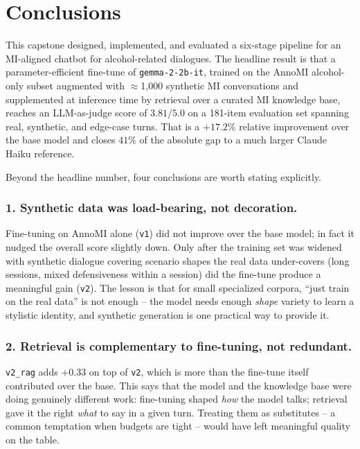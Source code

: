 \section{Conclusions}
\label{sec:conclusions}

This capstone designed, implemented, and evaluated a six-stage pipeline for an
MI-aligned chatbot for alcohol-related dialogues. The headline result is that
a parameter-efficient fine-tune of \texttt{gemma-2-2b-it}, trained on the
AnnoMI alcohol-only subset augmented with $\approx$1{,}000 synthetic MI
conversations and supplemented at inference time by retrieval over a curated
MI knowledge base, reaches an LLM-as-judge score of $3.81/5.0$ on a
181-item evaluation set spanning real, synthetic, and edge-case turns. That
is a $+17.2\%$ relative improvement over the base model and closes $41\%$
of the absolute gap to a much larger Claude Haiku reference.

Beyond the headline number, four conclusions are worth stating explicitly.

\subsubsection*{1. Synthetic data was load-bearing, not decoration.}
Fine-tuning on AnnoMI alone (\texttt{v1}) did not improve over the base model;
in fact it nudged the overall score slightly down. Only after the training set
was widened with synthetic dialogue covering scenario shapes the real data
under-covers (long sessions, mixed defensiveness within a session) did the
fine-tune produce a meaningful gain (\texttt{v2}). The lesson is that for
small specialized corpora, ``just train on the real data'' is not enough --
the model needs enough \emph{shape} variety to learn a stylistic identity, and
synthetic generation is one practical way to provide it.

\subsubsection*{2. Retrieval is complementary to fine-tuning, not redundant.}
\texttt{v2\_rag} adds $+0.33$ on top of \texttt{v2}, which is more than the
fine-tune itself contributed over the base. This says that the model and the
knowledge base were doing genuinely different work: fine-tuning shaped
\emph{how} the model talks; retrieval gave it the right \emph{what} to say in
a given turn. Treating them as substitutes -- a common temptation when
budgets are tight -- would have left meaningful quality on the table.

